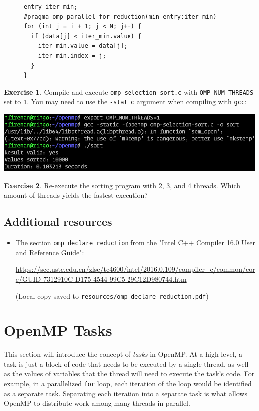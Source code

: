 \documentclass{article}
\newcommand{\resource}[1]{(Local copy saved to \texttt{#1})}
\theoremstyle{definition}
\newtheorem{exercise}{Exercise}
\begin{document}
\begin{figure}[H]
\begin{verbatim}
entry iter_min;
#pragma omp parallel for reduction(min_entry:iter_min)
for (int j = i + 1; j < N; j++) {
  if (data[j] < iter_min.value) {
    iter_min.value = data[j];
    iter_min.index = j;
  }
}
\end{verbatim}
\end{figure}

\begin{exercise}
Compile and execute \texttt{omp-selection-sort.c} with \texttt{OMP\_NUM\_THREADS} set to \texttt{1}. You may need to use the \texttt{-static} argument when compiling with \texttt{gcc}:

\includegraphics[width=\textwidth]{images/selection-sort-output.png}
\end{exercise}

\begin{exercise}
Re-execute the sorting program with 2, 3, and 4 threads. Which amount of threads yields the fastest execution?
\end{exercise}

\subsection*{Additional resources}

\begin{itemize}
    \item The section \texttt{omp declare reduction} from the "Intel C++ Compiler 16.0 User and Reference Guide":
    
    \url{https://scc.ustc.edu.cn/zlsc/tc4600/intel/2016.0.109/compiler_c/common/core/GUID-7312910C-D175-4544-99C5-29C12D980744.htm}

    \resource{resources/omp-declare-reduction.pdf}
\end{itemize}

\section{OpenMP Tasks}
\label{sec/tasks}

This section will introduce the concept of \emph{tasks} in OpenMP. At a high level, a task is just a block of code that needs to be executed by a single thread, as well as the values of variables that the thread will need to execute the task's code. For example, in a parallelized \texttt{for} loop, each iteration of the loop would be identified as a separate task. Separating each iteration into a separate task is what allows OpenMP to distribute work among many threads in parallel.
\end{document}
